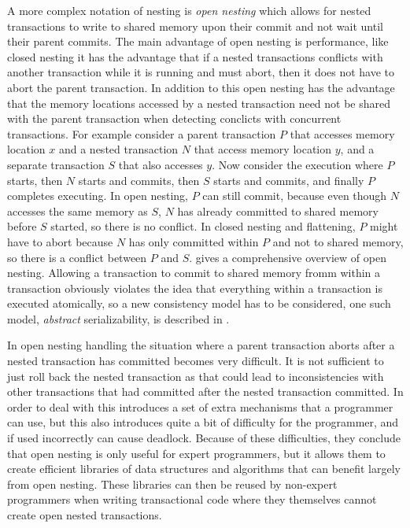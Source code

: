 A more complex notation of nesting is \emph{open nesting} which allows for nested transactions to write to shared memory upon their commit and not wait until their parent commits.
The main advantage of open nesting is performance, like closed nesting it has the advantage that if a nested transactions conflicts with another transaction while it is running and must abort, then it does not have to abort the parent transaction.
In addition to this open nesting has the advantage that the memory locations accessed by a nested transaction need not be shared with the parent transaction when detecting conclicts with concurrent transactions.
For example consider a parent transaction $P$ that accesses memory location $x$ and a nested transaction $N$ that access memory location $y$, and a separate transaction $S$ that also accesses $y$.
Now consider the execution where $P$ starts, then $N$ starts and commits, then $S$ starts and commits, and finally $P$ completes executing.
In open nesting, $P$ can still commit, because even though $N$ accesses the same memory as $S$, $N$ has already committed to shared memory before $S$ started, so there is no conflict. 
In closed nesting and flattening, $P$ might have to abort because $N$ has only committed within $P$ and not to shared memory, so there is a conflict between $P$ and $S$.
\cite{_opennested} gives a comprehensive overview of open nesting.
Allowing a transaction to commit to shared memory fromm within a transaction obviously violates the idea that everything within a transaction is executed atomically, so a new consistency model has to be considered, one such model, \emph{abstract} serializability, is described  in \cite{1229442}.

In open nesting handling the situation where a parent transaction aborts after a nested transaction has committed becomes very difficult.
It is not sufficient to just roll back the nested transaction as that could lead to inconsistencies with other transactions that had committed after the nested transaction committed.
In order to deal with this \cite{1229442} introduces a set of extra mechanisms that a programmer can use, but this also introduces quite a bit of difficulty for the programmer, and if used incorrectly can cause deadlock.
Because of these difficulties, they \cite{1229442} conclude that open nesting is only useful for expert programmers, but it allows them to create efficient libraries of data structures and algorithms that can benefit largely from open nesting.
These libraries can then be reused by non-expert programmers when writing transactional code where they themselves cannot create open nested transactions.

